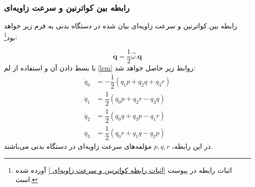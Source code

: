 \subsubsection{رابطه بین کواترنین و سرعت زاویه‌ای}
رابطه بین کواترنین و سرعت زاویه‌ای بیان شده در دستگاه بدنی به فرم زیر خواهد بود\footnote{اثبات رابطه در پیوست \ref{اثبات رابطه کواترنین و سرعت زاویه‌ای } آورده شده است.}:\cite{diebel2006representing}
 
\begin{equation} \label{کواترنین و سرعت زاویه‌ای}
\dot{ \textbf{q}}=\dfrac{1}{2} \vec \omega .\textbf{q}
\end{equation}
با بسط دادن آن و استفاده از لم \eqref{lem} روابط زیر حاصل خواهد شد:
\begin{equation}
\begin{split}
\dot q_{{0}}&=-\dfrac{1}{2} \left( q_{{1}}p+q_{{2}}q+q_{{3}}r \right)  \\
\dot q_{{1}}&=\dfrac{1}{2} \left( q_{{0}}p+q_{{2}}r-q_{{3}}q \right)  \\
\dot q_{{2}}&=\dfrac{1}{2} \left( q_{{0}}q+q_{{3}}p-q_{{1}}r \right)  \\
\dot q_{{3}}&=\dfrac{1}{2} \left( q_{{0}}r+q_{{1}}q-q_{{2}}p \right) 
\end{split}
\end{equation}
در این رابطه، $ p , q , r $  مؤلفه‌های سرعت زاویه‌ای در دستگاه بدنی می‌باشند.
